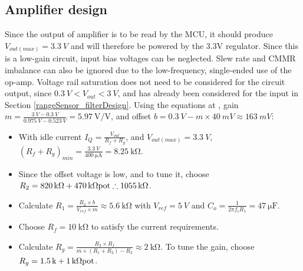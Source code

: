 \subsection{Amplifier design}

Since the output of amplifier is to be read by the MCU, it should produce $V_{out(max)} = \SI{3.3}{V}$
and will therefore be powered by the 3.3V regulator. Since this is a low-gain circuit, input bias voltages can be neglected.
Slew rate and CMMR imbalance can also be ignored due to the low-frequency, single-ended use of the op-amp. Voltage rail saturation does not need to be considered for the circuit output,
since $\SI{0.3}{V} < V_{out} < \SI{3}{V}$, and has already been considered for the input in Section \ref{rangeSensor_filterDesign}.
Using the equations at \cite{gainOffset30Seconds}, gain $m = \frac{\SI{3}{V} - \SI{0.3}{V}}{\SI{0.975}{V} - \SI{0.523}{V}} = \SI{5.97}{\volt\per\volt}$,
and offset $b = \SI{0.3}{V} - m \times \SI{40}{mV} \approx \SI{163}{mV}$:

\begin{itemize}
  \item With idle current $I_Q = \frac{V_{out}}{R_f + R_g}$, and $V_{out(max)} = \SI{3.3}{V}$, $(R_f + R_g)_{min} = \frac{\SI{3.3}{V}}{\SI{400}{\micro\ampere}} = \SI{8.25}{\kilo\ohm}$.
  \item Since the offset voltage is low, and to tune it, choose $R_2 = \SI{820}{\kilo\ohm} + \SI{470}{\kilo\ohm} \textnormal{pot} \therefore \SI{1055}{\kilo\ohm}$.
  \item Calculate $R_1 = \frac{R_2 \times b}{V_{ref} \times m} \approx \SI{5.6}{\kilo\ohm}$ with $V_{ref} = \SI{5}{V}$ and $C_o = \frac{1}{2 \pi f_c R_1} = \SI{47}{\micro\farad}$.
  \item Choose $R_f = \SI{10}{\kilo\ohm}$ to satisfy the current requirements.
  \item Calculate $R_g = \frac{R_2 \times R_f}{m \times (R_1 + R_2) - R_2} \approx \SI{2}{\kilo\ohm}$. To tune the gain, choose $R_g = \SI{1.5}{k} + \SI{1}{\kilo\ohm}\textnormal{pot}$.
\end{itemize}